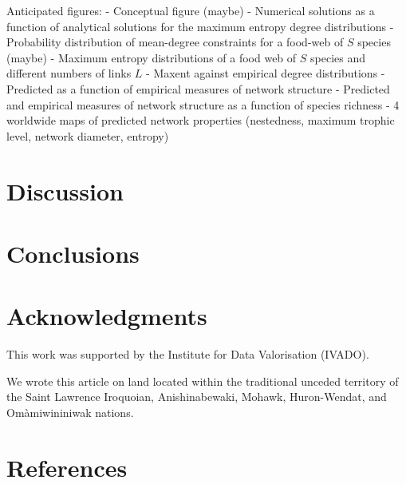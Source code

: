 \documentclass[10pt,oneside]{article}
\begin{document}
Anticipated figures: - Conceptual figure (maybe) - Numerical solutions
as a function of analytical solutions for the maximum entropy degree
distributions - Probability distribution of mean-degree constraints for
a food-web of \(S\) species (maybe) - Maximum entropy distributions of a
food web of \(S\) species and different numbers of links \(L\) - Maxent
against empirical degree distributions - Predicted as a function of
empirical measures of network structure - Predicted and empirical
measures of network structure as a function of species richness - 4
worldwide maps of predicted network properties (nestedness, maximum
trophic level, network diameter, entropy)

\hypertarget{discussion}{%
\section{Discussion}\label{discussion}}

\hypertarget{conclusions}{%
\section{Conclusions}\label{conclusions}}

\hypertarget{acknowledgments}{%
\section{Acknowledgments}\label{acknowledgments}}

This work was supported by the Institute for Data Valorisation (IVADO).

We wrote this article on land located within the traditional unceded
territory of the Saint Lawrence Iroquoian, Anishinabewaki, Mohawk,
Huron-Wendat, and Omàmiwininiwak nations.

\hypertarget{references}{%
\section*{References}\label{references}}
\end{document}
